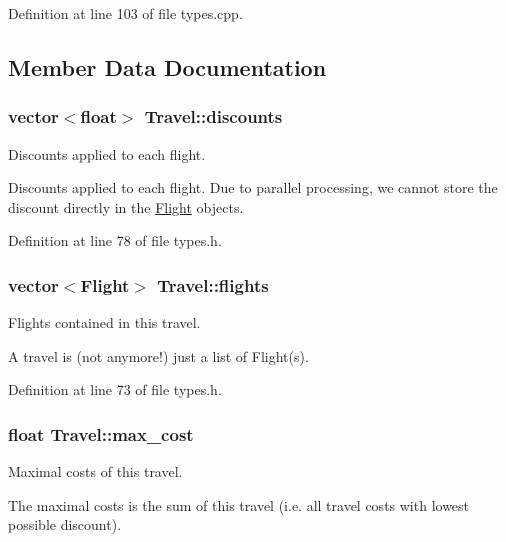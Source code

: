 Definition at line 103 of file types.\-cpp.



\subsection{Member Data Documentation}
\hypertarget{class_travel_a153257830f638fa10e69f6c83a92e1fe}{
\subsubsection[{discounts}]{\setlength{\rightskip}{0pt plus 5cm}vector$<$float$>$ Travel\-::discounts}}\label{class_travel_a153257830f638fa10e69f6c83a92e1fe}


Discounts applied to each flight. 

Discounts applied to each flight. Due to parallel processing, we cannot store the discount directly in the \hyperlink{struct_flight}{Flight} objects. 

Definition at line 78 of file types.\-h.

\hypertarget{class_travel_ad6f9e84e91a48ffcf60b7de21f01b0b5}{
\subsubsection[{flights}]{\setlength{\rightskip}{0pt plus 5cm}vector$<${\bf Flight}$>$ Travel\-::flights}}\label{class_travel_ad6f9e84e91a48ffcf60b7de21f01b0b5}


Flights contained in this travel. 

A travel is (not anymore!) just a list of Flight(s). 

Definition at line 73 of file types.\-h.

\hypertarget{class_travel_a9bd372e0cfad472282e23aa6273a5faa}{
\subsubsection[{max\-\_\-cost}]{\setlength{\rightskip}{0pt plus 5cm}float Travel\-::max\-\_\-cost}}\label{class_travel_a9bd372e0cfad472282e23aa6273a5faa}


Maximal costs of this travel. 

The maximal costs is the sum of this travel (i.\-e. all travel costs with lowest possible discount). 

